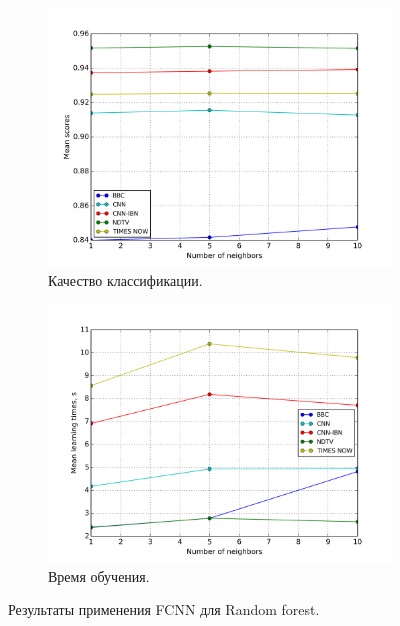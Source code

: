 \begin{figure}[h!]
	\centering
	\begin{subfigure}{0.45\textwidth}
		\includegraphics[width=\textwidth]{images/fcnn-randforest.png}
		\caption{Качество классификации.}
	\end{subfigure}
	\begin{subfigure}{0.45\textwidth}
		\includegraphics[width=\textwidth]{images/fcnn-randforestTime.png}
		\caption{Время обучения.}
	\end{subfigure}
	\caption{Результаты применения FCNN для Random forest.}\label{fig:fcnn-rf-results}
\end{figure}

